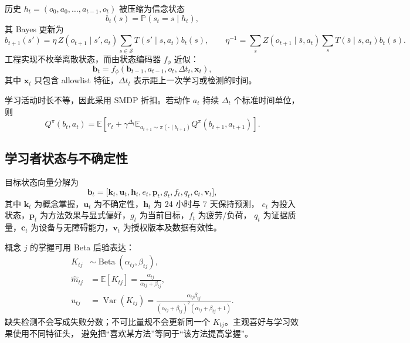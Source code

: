 \documentclass[11pt,a4paper,fontset=none]{ctexart}
\newcommand{\E}{\mathbb{E}}
\newcommand{\Prb}{\mathbb{P}}
\newcommand{\1}{\mathbb{I}}
\begin{document}
历史 $h_t=(o_0,a_0,\ldots,a_{t-1},o_t)$ 被压缩为信念状态
\begin{equation}
  b_t(s)=\Prb(s_t=s\mid h_t),
\end{equation}
其 Bayes 更新为
\begin{equation}
  b_{t+1}(s')=
  \eta\,Z(o_{t+1}\mid s',a_t)
  \sum_{s\in\mathcal{S}}T(s'\mid s,a_t)b_t(s),
  \qquad
  \eta^{-1}=\sum_{\bar s}Z(o_{t+1}\mid \bar s,a_t)
  \sum_sT(\bar s\mid s,a_t)b_t(s).
  \label{eq:belief-update}
\end{equation}
工程实现不枚举离散状态，而由状态编码器 $f_\phi$ 近似：
\begin{equation}
  \bm b_t=f_\phi(\bm b_{t-1},a_{t-1},o_t,\Delta t_t,\bm x_t),
  \label{eq:belief-encoder}
\end{equation}
其中 $\bm x_t$ 只包含 allowlist 特征，$\Delta t_t$ 表示距上一次学习或检测的时间。

学习活动时长不等，因此采用 SMDP 折扣。若动作 $a_t$ 持续 $\Delta_t$ 个标准时间单位，则
\begin{equation}
  Q^\pi(b_t,a_t)=\E\!\left[
    r_t+\gamma^{\Delta_t}\E_{a_{t+1}\sim\pi(\cdot\mid b_{t+1})}
    Q^\pi(b_{t+1},a_{t+1})
  \right].
  \label{eq:smdp-q}
\end{equation}

\subsection{学习者状态与不确定性}

目标状态向量分解为
\begin{equation}
  \bm b_t=
  \bigl[
    \bm k_t,\bm u_t,\bm h_t,e_t,\bm p_t,g_t,f_t,q_t,\bm c_t,\bm v_t
  \bigr],
  \label{eq:state-vector}
\end{equation}
其中 $\bm k_t$ 为概念掌握，$\bm u_t$ 为不确定性，$\bm h_t$ 为 24 小时与 7 天保持预测，
$e_t$ 为投入状态，$\bm p_t$ 为方法效果与显式偏好，$g_t$ 为当前目标，$f_t$ 为疲劳/负荷，
$q_t$ 为证据质量，$\bm c_t$ 为设备与无障碍能力，$\bm v_t$ 为授权版本及数据有效性。

概念 $j$ 的掌握可用 Beta 后验表达：
\begin{align}
  K_{tj} &\sim \operatorname{Beta}(\alpha_{tj},\beta_{tj}),\\
  \widehat m_{tj} &= \E[K_{tj}]=\frac{\alpha_{tj}}{\alpha_{tj}+\beta_{tj}},\\
  u_{tj} &= \operatorname{Var}(K_{tj})=
    \frac{\alpha_{tj}\beta_{tj}}
    {(\alpha_{tj}+\beta_{tj})^2(\alpha_{tj}+\beta_{tj}+1)}.
  \label{eq:beta-mastery}
\end{align}
缺失检测不会写成失败分数；不可比量规不会更新同一个 $K_{tj}$。主观喜好与学习效果使用不同特征头，
避免把“喜欢某方法”等同于“该方法提高掌握”。
\end{document}
